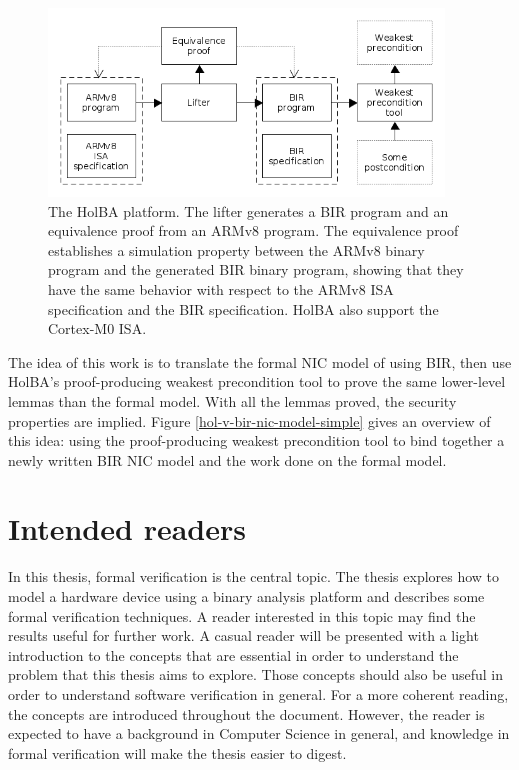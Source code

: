 \documentclass{kththesis}
\begin{document}
\begin{figure}[ht]
	\includegraphics[height=5cm]{figures/holba-overview.png}
	\centering
	\caption{The HolBA platform. The lifter generates a BIR program and an equivalence proof from an ARMv8 program. The equivalence proof establishes a simulation property between the ARMv8 binary program and the generated BIR binary program, showing that they have the same behavior with respect to the ARMv8 \gls{ISA} specification and the BIR specification. HolBA also support the Cortex-M0 ISA.}
	\label{holba-overview}
\end{figure}

The idea of this work is to translate the formal \gls{NIC} model of \cite{haglund_formal_2016} using \gls{BIR}, then use HolBA's proof-producing weakest precondition tool to prove the same lower-level lemmas than the formal model. With all the lemmas proved, the security properties are implied. Figure \ref{hol-v-bir-nic-model-simple} gives an overview of this idea: using the proof-producing weakest precondition tool to bind together a newly written BIR NIC model and the work done on the formal model.

\section{Intended readers}

In this thesis, formal verification is the central topic. The thesis explores how to model a hardware device using a binary analysis platform and describes some formal verification techniques. A reader interested in this topic may find the results useful for further work. A casual reader will be presented with a light introduction to the concepts that are essential in order to understand the problem that this thesis aims to explore. Those concepts should also be useful in order to understand software verification in general. For a more coherent reading, the concepts are introduced throughout the document. However, the reader is expected to have a background in Computer Science in general, and knowledge in formal verification will make the thesis easier to digest.
\end{document}
